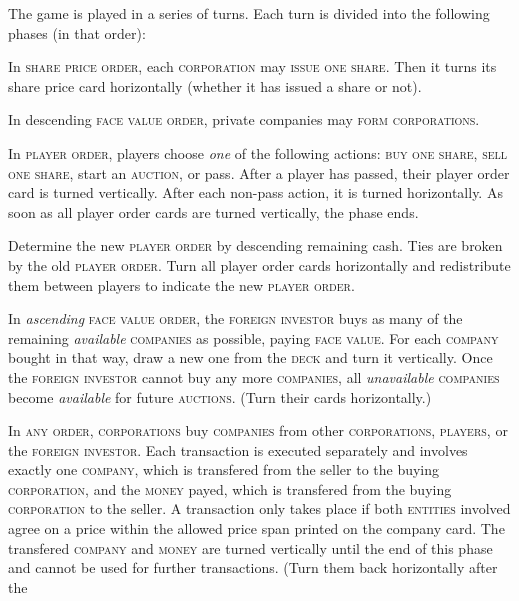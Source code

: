\documentclass[11pt,a4paper]{article}
\newcounter{itemcounter}
\newenvironment{my_enumerate}
{\begin{list}{\arabic{itemcounter}.}
  {\usecounter{itemcounter}\leftmargin=1.8em}
  \setlength{\itemsep}{1pt}
  \setlength{\parskip}{0pt}
  \setlength{\parsep}{0pt}
}
{\end{list}}
\begin{document}
\begin{multicols}{2}
{The game is played in a series of turns. Each turn is divided into the
following phases (in that order):

\begin{my_enumerate}
\item In \textsc{share price order}, each \textsc{corporation}
  may \textsc{issue one share}. Then it turns its share price card
  horizontally (whether it has issued a share or not).
\item In descending \textsc{face value order}, private companies may
  \textsc{form corporations}.
\item In \textsc{player order}, players choose \emph{one} of the
  following actions: \textsc{buy one share}, \textsc{sell one share},
  start an \textsc{auction}, or pass. After a player has passed, their
  player order card is turned vertically. After each non-pass action,
  it is turned horizontally. As soon as all player order cards are
  turned vertically, the phase ends.
\item Determine the new \textsc{player order} by descending remaining
  cash. Ties are broken by the old \textsc{player order}. Turn all
  player order cards horizontally and redistribute them between
  players to indicate the new \textsc{player order}.
\item In \emph{ascending} \textsc{face value order}, the
  \textsc{foreign investor} buys as many of the remaining
  \emph{available} \textsc{companies} as possible, paying \textsc{face
    value}. For each \textsc{company} bought in that way, draw a new
  one from the \textsc{deck} and turn it vertically. Once the
  \textsc{foreign investor} cannot buy any more \textsc{companies},
  all \emph{unavailable} \textsc{companies} become \emph{available}
  for future \textsc{auctions}. (Turn their cards horizontally.)
\item In \textsc{any order}, \textsc{corporations} buy
  \textsc{companies} from other \textsc{corporations},
  \textsc{players}, or the \textsc{foreign investor}. Each transaction
  is executed separately and involves exactly one \textsc{company},
  which is transfered from the seller to the buying
  \textsc{corporation}, and the \textsc{money} payed, which is
  transfered from the buying \textsc{corporation} to the seller. A
  transaction only takes place if both \textsc{entities} involved
  agree on a price within the allowed price span printed on the
  company card. The transfered \textsc{company} and \textsc{money}
  are turned vertically until the end of this phase and cannot be used
  for further transactions. (Turn them back horizontally after the

\end{my_enumerate}}
\end{multicols}
\end{document}
